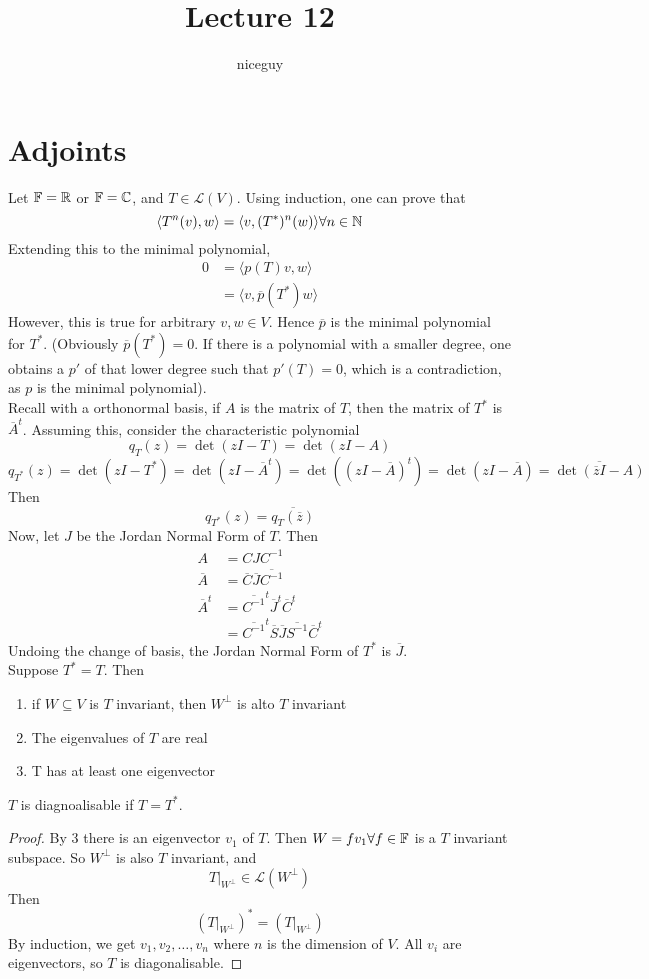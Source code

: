 \documentclass[12pt]{article}
\author{niceguy}
\title{Lecture 12}
\begin{document}
\maketitle

\section{Adjoints}

Let $\mathbb{F} = \mathbb{R}$ or $\mathbb{F} = \mathbb{C}$, and $T \in \mathcal L(V)$. Using induction, one can prove that
$$\langle T^n(v),w \rangle = \langle v,(T^*)^n(w) \rangle \forall n \in \mathbb{N}$$
Extending this to the minimal polynomial,
\begin{align*}
	0 &= \langle p(T)v,w \rangle \\
	  &= \langle v,\overline{p}(T^*)w \rangle
\end{align*}
However, this is true for arbitrary $v,w \in V$. Hence $\overline{p}$ is the minimal polynomial for $T^*$. (Obviously $\overline{p}(T^*) = 0$. If there is a polynomial with a smaller degree, one obtains a $p'$ of that lower degree such that $p'(T) = 0$, which is a contradiction, as $p$ is the minimal polynomial). \\
Recall with a orthonormal basis, if $A$ is the matrix of $T$, then the matrix of $T^*$ is $\overline{A}^t$. Assuming this, consider the characteristic polynomial
$$q_T(z) = \det(zI-T) = \det(zI-A)$$
$$q_{T^*}(z) = \det(zI-T^*) = \det(zI-\overline{A}^t) = \det\left((zI-\overline{A})^t\right) = \det(zI-\overline{A}) = \overline{\det(\overline{z}I-A)}$$
Then
$$q_{T^*}(z) = \overline{q_T(\overline{z})}$$
Now, let $J$ be the Jordan Normal Form of $T$. Then
\begin{align*}
	A &= CJC^{-1} \\
	\overline{A} &= \overline{C}\overline{J}\overline{C^{-1}} \\
	\overline{A}^t &= \overline{C^{-1}}^t\overline{J}^t\overline{C}^t \\
		       &= \overline{C^{-1}}^t\overline{S}\overline{J}\overline{S^{-1}}\overline{C}^t
\end{align*}
Undoing the change of basis, the Jordan Normal Form of $T^*$ is $\overline{J}$. \\
Suppose $T^* = T$. Then
\begin{enumerate}
	\item if $W \subseteq V$ is $T$ invariant, then $W^\perp$ is alto $T$ invariant
	\item The eigenvalues of $T$ are real
	\item T has at least one eigenvector
\end{enumerate}

\begin{thm}
	$T$ is diagnoalisable if $T=T^*$.
\end{thm}

\begin{proof}
	By 3 there is an eigenvector $v_1$ of $T$. Then $W = fv_1 \forall f \in \mathbb{F}$ is a $T$ invariant subspace. So $W^\perp$ is also $T$ invariant, and
	$$T|_{W^\perp} \in \mathcal L(W^\perp)$$
	Then
	$$\left(T|_{W^\perp}\right)^* = \left(T|_{W^\perp}\right)$$
	By induction, we get $v_1,v_2,\dots,v_n$ where $n$ is the dimension of $V$. All $v_i$ are eigenvectors, so $T$ is diagonalisable.
\end{proof}
\end{document}
